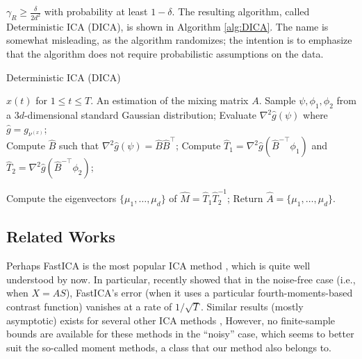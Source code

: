 \documentclass{article} %
\theoremstyle{definition}
\begin{document}
 $\gamma_R \ge\frac{\delta}{2d^2}$ with probability at least $1-\delta$.
The resulting algorithm, called Deterministic ICA (DICA), is shown in Algorithm \ref{alg:DICA}. 
The name is somewhat misleading, as the algorithm randomizes; the intention is to emphasize that the algorithm does not require probabilistic assumptions on the data.
\begin{algorithm}
\caption{Deterministic ICA (DICA)}
\label{alg:DICA}
\begin{algorithmic}[1]
\INPUT $x(t)$ for $1\le t \le T$. 
\OUTPUT An estimation of the mixing matrix $A$. 
\STATE Sample $\psi, \phi_1, \phi_2$ from a $3d$-dimensional standard Gaussian distribution;
\STATE Evaluate $\nabla^2 \hat{g}(\psi)$ where $\hat{g} = g_{\nu^{(x)}}$; \\
\STATE Compute $\hat{B}$ such that $\nabla^2\hat{g}(\psi) = \hat{B}\hat{B}^{\top}$;
\STATE Compute $\hat{T}_1 =\nabla^2\hat{g}(\hat{B}^{-\top}\phi_1)$ and  $\hat{T}_2 =\nabla^2\hat{g}(\hat{B}^{-\top}\phi_2)$;

\STATE Compute the eigenvectors $\{\mu_1,\ldots,\mu_d\}$ of $\hat{M} = \hat{T}_1\hat{T}_2^{-1}$;
\STATE Return $\hat{A} = \{\mu_1,\ldots,\mu_d\}$.
\end{algorithmic}
\end{algorithm}
\vspace*{-0.2in}
\subsection{Related Works}
\label{subsec:relatedWorks}
Perhaps FastICA is the most popular ICA method  \citep{hyvarinen1999fast}, which is quite well understood by now.
In particular, recently \citet{miettinen2014fourth} showed that in the noise-free case (i.e., when $X = AS$), FastICA's error (when it uses a particular fourth-moments-based contrast function) vanishes at a rate of $1/\sqrt{T}$. %
Similar results (mostly asymptotic) exists for several other ICA methods
\citep[e.g.,][]{eriksson2003characteristic,samarov2004nonparametric,chen2005consistent,chen2006efficient},
However, no finite-sample bounds are available for these methods in the ``noisy'' case, which seems to better suit the so-called moment methods, a class that our method also belongs to.
\end{document}
